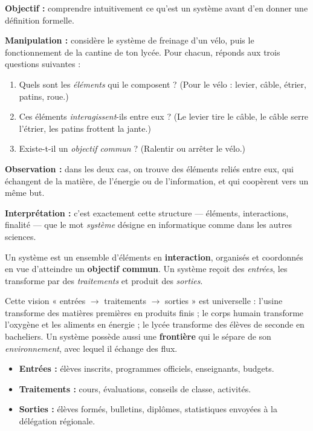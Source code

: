 \documentclass[11pt]{article}
\newcommand{\cle}[1]{{\popxbold\color{popdark}#1}}
\newcounter{popsec}
\newcounter{popsub}
\newcommand{\courssub}[1]{%
  \stepcounter{popsub}%
  \par\vspace{9pt}\noindent{\popxbold\fontsize{11.5}{13}\selectfont\color{popink}{\color{poporange}\thepopsec.\thepopsub}\hspace{6pt}#1}\par\nopagebreak\vspace{4pt}
}
\begin{document}
\courssub{La notion de système}

\begin{experience}
\textbf{Objectif :} comprendre intuitivement ce qu'est un système avant d'en donner une définition formelle.

\textbf{Manipulation :} considère le système de freinage d'un vélo, puis le fonctionnement de la cantine de ton lycée. Pour chacun, réponds aux trois questions suivantes :
\begin{enumerate}
  \item Quels sont les \emph{éléments} qui le composent ? (Pour le vélo : levier, câble, étrier, patins, roue.)
  \item Ces éléments \emph{interagissent}-ils entre eux ? (Le levier tire le câble, le câble serre l'étrier, les patins frottent la jante.)
  \item Existe-t-il un \emph{objectif commun} ? (Ralentir ou arrêter le vélo.)
\end{enumerate}

\textbf{Observation :} dans les deux cas, on trouve des éléments reliés entre eux, qui échangent de la matière, de l'énergie ou de l'information, et qui coopèrent vers un même but.

\textbf{Interprétation :} c'est exactement cette structure — éléments, interactions, finalité — que le mot \emph{système} désigne en informatique comme dans les autres sciences.
\end{experience}

\begin{definition}[Système]
Un \cle{système} est un ensemble d'éléments en \textbf{interaction}, organisés et coordonnés en vue d'atteindre un \textbf{objectif commun}. Un système reçoit des \emph{entrées}, les transforme par des \emph{traitements} et produit des \emph{sorties}.
\end{definition}

Cette vision « entrées $\rightarrow$ traitements $\rightarrow$ sorties » est universelle : l'usine transforme des matières premières en produits finis ; le corps humain transforme l'oxygène et les aliments en énergie ; le lycée transforme des élèves de seconde en bacheliers. Un système possède aussi une \textbf{frontière} qui le sépare de son \emph{environnement}, avec lequel il échange des flux.

\begin{exemplebox}
\begin{itemize}
  \item \textbf{Entrées :} élèves inscrits, programmes officiels, enseignants, budgets.
  \item \textbf{Traitements :} cours, évaluations, conseils de classe, activités.
  \item \textbf{Sorties :} élèves formés, bulletins, diplômes, statistiques envoyées à la délégation régionale.
\end{itemize}
\end{exemplebox}
\end{document}

